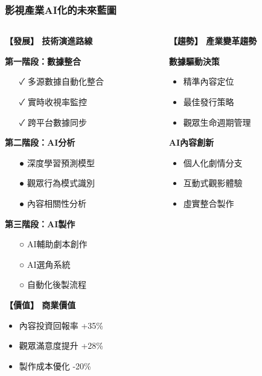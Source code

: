\documentclass[10pt]{beamer}
\begin{document}
\begin{frame}
\frametitle{影視產業AI化的未來藍圖}

\begin{columns}[T]
\begin{column}{0.5\textwidth}
\textbf{【發展】 技術演進路線}

\textbf{第一階段：數據整合}
\begin{itemize}
    \item [✓] 多源數據自動化整合
    \item [✓] 實時收視率監控
    \item [✓] 跨平台數據同步
\end{itemize}

\textbf{第二階段：AI分析}
\begin{itemize}
    \item [●] 深度學習預測模型
    \item [●] 觀眾行為模式識別
    \item [●] 內容相關性分析
\end{itemize}

\textbf{第三階段：AI製作}
\begin{itemize}
    \item [○] AI輔助劇本創作
    \item [○] AI選角系統
    \item [○] 自動化後製流程
\end{itemize}

\vspace{0.3cm}
\textbf{【價值】 商業價值}
\begin{itemize}
    \item 內容投資回報率 +35\%
    \item 觀眾滿意度提升 +28\%
    \item 製作成本優化 -20\%
\end{itemize}
\end{column}

\begin{column}{0.5\textwidth}
\textbf{【趨勢】 產業變革趨勢}

\textbf{數據驅動決策}
\begin{itemize}
    \item 精準內容定位
    \item 最佳發行策略
    \item 觀眾生命週期管理
\end{itemize}

\textbf{AI內容創新}
\begin{itemize}
    \item 個人化劇情分支
    \item 互動式觀影體驗
    \item 虛實整合製作
\end{itemize}


\end{column}
\end{columns}
\end{frame}
\end{document}
